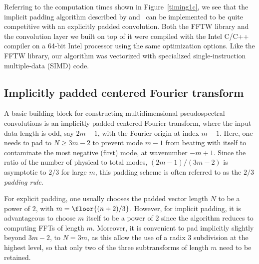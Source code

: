 \documentclass[final]{siamltex}
\begin{document}
Referring to the computation times shown in Figure~\ref{timing1c},
we see that the implicit padding algorithm described by  
and~
can be implemented to be quite competitive with an explicitly padded
convolution. Both the FFTW library and the convolution layer we built on top of it were compiled with the
Intel C/C++ compiler on a 64-bit Intel processor using the same optimization
options. Like the FFTW library, our algorithm was vectorized with
specialized single-instruction multiple-data (SIMD) code.

\subsection{Implicitly padded centered Fourier transform}\label{fft0}
A basic building block for constructing multidimensional pseudospectral
convolutions is an implicitly padded centered Fourier transform, where the
input data length is odd, say $2m-1$, with the Fourier origin at index $m-1$. 
Here, one needs to pad to $N\ge 3m-2$ to prevent 
mode $m-1$ from beating with itself to contaminate the most negative
(first) mode, at wavenumber $-m+1$. Since the ratio of the number of physical to
total modes, $(2m-1)/(3m-2)$ is asymptotic to $2/3$ for large $m$, this
padding scheme is often referred to as the {\it $2/3$ padding rule}.

For explicit padding, one usually chooses the padded vector length
$N$ to be a power of $2$, with $m=\floor{(n+2)/3}$. However, for implicit
padding, it is advantageous to choose $m$ itself to be a power of $2$
since the algorithm reduces to computing FFTs of length $m$.
Moreover, it is convenient to pad implicitly slightly beyond $3m-2$, to $N=3m$,
as this allow the use of a radix $3$ subdivision at the highest level, so
that only two of the three subtransforms of length $m$ need to be retained. 
\end{document}
